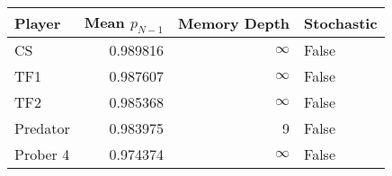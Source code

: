\begin{tabular}{lrrl}
\toprule
   Player &  Mean $p_{N-1}$ &  Memory Depth & Stochastic \\
\midrule
       CS &        0.989816 &            \(\infty\) &      False \\
      TF1 &        0.987607 &            \(\infty\) &      False \\
      TF2 &        0.985368 &            \(\infty\) &      False \\
 Predator &        0.983975 &             9 &      False \\
 Prober 4 &        0.974374 &            \(\infty\) &      False \\
\bottomrule
\end{tabular}
